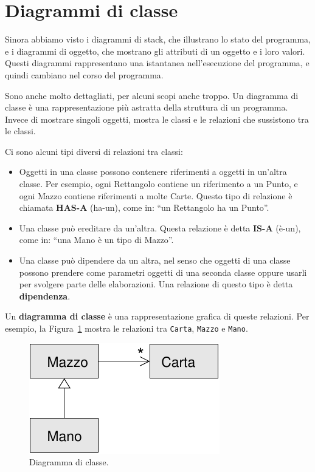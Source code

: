 \documentclass[10pt]{book}
\begin{document}
\section{Diagrammi di classe}
\label{class.diagram}

Sinora abbiamo visto i diagrammi di stack, che illustrano lo stato del programma, e i diagrammi di oggetto, che mostrano gli attributi di un oggetto e i loro valori. Questi diagrammi rappresentano una istantanea nell'esecuzione del programma, e quindi cambiano nel corso del programma.

Sono anche molto dettagliati, per alcuni scopi anche troppo. Un diagramma di classe è una rappresentazione più astratta della struttura di un programma. Invece di mostrare singoli oggetti, mostra le classi e le relazioni che sussistono tra le classi.

Ci sono alcuni tipi diversi di relazioni tra classi:

\begin{itemize}

\item Oggetti in una classe possono contenere riferimenti a oggetti in un'altra classe. Per esempio, ogni Rettangolo contiene un riferimento a un Punto, e ogni Mazzo contiene riferimenti a molte Carte. Questo tipo di relazione è chiamata {\bf HAS-A} (ha-un), come in: ``un Rettangolo ha un Punto''.

\item Una classe può ereditare da un'altra. Questa relazione è detta {\bf IS-A} (è-un), come in: ``una Mano è un tipo di Mazzo''.

\item Una classe può dipendere da un altra, nel senso che oggetti di una classe possono prendere come parametri oggetti di una seconda classe oppure usarli per svolgere parte delle elaborazioni. Una relazione di questo tipo è detta {\bf dipendenza}. 

\end{itemize}

Un {\bf diagramma di classe} è una rappresentazione grafica di queste relazioni.  Per esempio, la Figura~\ref{fig.class1} mostra le relazioni tra {\tt Carta}, {\tt Mazzo} e {\tt Mano}.

\begin{figure}
\centerline
{\includegraphics[scale=0.8]{figs/class1.pdf}}
\caption{Diagramma di classe.}
\label{fig.class1}
\end{figure}
\end{document}
